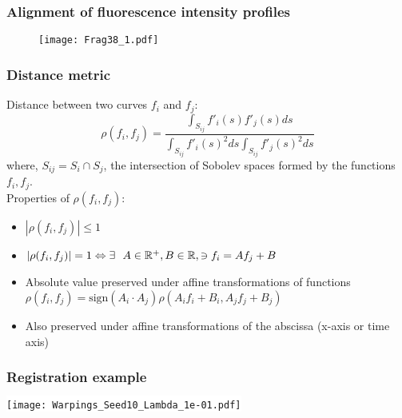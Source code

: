 \documentclass[10pt,dvipsnames,table, notes]{beamer}
\begin{document}
\begin{frame}
\frametitle{Alignment of fluorescence intensity profiles}
\begin{figure}
\texttt{[image: Frag38\_1.pdf]}
\end{figure}

\end{frame}

\begin{frame}
\frametitle{Distance metric}
Distance between two curves $f_i$ and $f_j$:
\[ \rho(f_i, f_j) = \frac{\int _{S_{ij}}f'_i(s)f'_j(s) ds}{\int _{S_{ij}}f'_i(s)^2 ds \int _{S_{ij}}f'_j(s)^2 ds} \]
where, $S_{ij} = S_i \cap S_j$, the intersection of Sobolev spaces formed by the functions $f_i, f_j$.\\
Properties of $\rho(f_i, f_j)$:
\begin{itemize}
\item $|\rho(f_i, f_j)| \leq 1$
\item $|\rho(f_i, f_j)| = 1 \Leftrightarrow \exists \ \ A \in \mathbb{R} ^+, B \in \mathbb{R}, \ni f_i = Af_j + B$
\item Absolute value preserved under affine transformations of functions \\
$\rho(f_i, f_j) = \text{sign}(A_i\cdot A_j) \rho(A_if_i + B_i, A_jf_j + B_j)$
\item Also preserved under affine transformations of the abscissa (x-axis or time axis)
\end{itemize}


\end{frame}

\begin{frame}
\frametitle{Registration example}
\begin{center}
\colorbox{white}{\texttt{[image: Warpings\_Seed10\_Lambda\_1e-01.pdf]}}
\end{center}

\end{frame}
\end{document}
